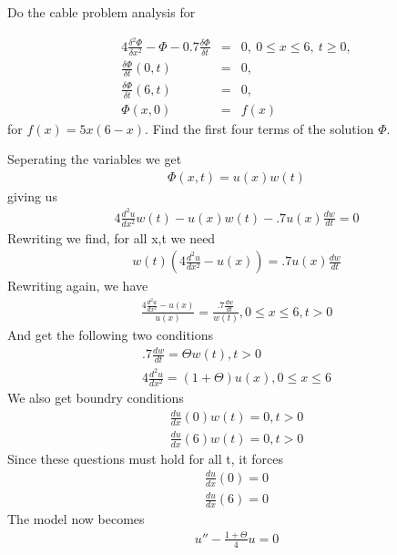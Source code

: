 \documentclass[11pt]{SelfArxOneColBMN}
\begin{document}
\noindent Do the cable problem analysis for
\begin{exercise}
  \begin{eqnarray*}
    4\frac{\delta^2 \Phi}{\delta x^2} - \Phi - 0.7\frac{\delta\Phi}{\delta t} &=& 0, \: 0 \leq x \leq 6, \: t \geq 0,\\
    \frac{\delta\Phi}{\delta t}(0,t) &=& 0,\\
    \frac{\delta\Phi}{\delta t}(6,t) &=& 0,\\
    \Phi(x,0) &=& f(x)
  \end{eqnarray*}
  for $f(x) = 5x(6 - x)$. Find the first four terms of the solution $\Phi$.

  \begin{solution}
    Seperating the variables we get
    \begin{eqnarray*}
      \Phi(x,t) = u(x)w(t)
    \end{eqnarray*}
    giving us
    \begin{eqnarray*}
      4\frac{d^2u}{dx^2}w(t) - u(x)w(t) - .7u(x)\frac{dw}{dt} = 0 
    \end{eqnarray*}
    Rewriting we find, for all x,t we need
    \begin{eqnarray*}
      w(t)(4\frac{d^2u}{dx^2} - u(x)) = .7u(x)\frac{dw}{dt}
    \end{eqnarray*}
    Rewriting again, we have
    \begin{eqnarray*}
      \frac{4\frac{d^2u}{dx^2} - u(x)}{u(x)} = \frac{.7\frac{dw}{dt}}{w(t)}, 0 \leq x \leq 6, t > 0
    \end{eqnarray*}
    And get the following two conditions
    \begin{eqnarray*}
      .7\frac{dw}{dt} = \Theta w(t), t > 0\\
      4\frac{d^2u}{dx^2} = (1 + \Theta)u(x), 0 \leq x \leq 6
    \end{eqnarray*}
    We also get boundry conditions
    \begin{eqnarray*}
      \frac{du}{dx}(0)w(t) = 0, t > 0\\
      \frac{du}{dx}(6)w(t) = 0, t > 0
    \end{eqnarray*}
    Since these questions must hold for all t, it forces
    \begin{eqnarray*}
      \frac{du}{dx}(0) = 0\\
      \frac{du}{dx}(6) = 0
    \end{eqnarray*}
    The model now becomes
    \begin{eqnarray*}
      u'' - \frac{1 + \Theta}{4}u = 0\\

\end{eqnarray*}
\end{solution}
\end{exercise}
\end{document}
